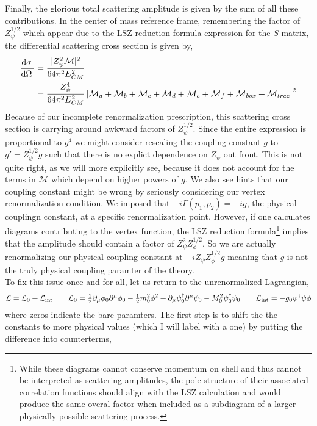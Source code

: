 \documentclass{article}
\begin{document}
Finally, the glorious total scattering amplitude is given by the sum of all these contributions. In the center of mass reference frame, remembering the factor of $Z_\psi^{1/2}$ which appear due to the LSZ reduction formula expression for the $S$ matrix, the differential scattering cross section is given by,
\begin{align*}
\frac{\mathrm{d}\sigma \:}{\mathrm{d}\Omega \:} & = \frac{|Z^2_{\psi} \mathcal{M}|^2}{64 \pi^2 E_{CM}^2}
\\
& = \frac{Z^4_{\psi}}{64 \pi^2 E_{CM}^2} \left| \mathcal{M}_a + \mathcal{M}_b + \mathcal{M}_c + \mathcal{M}_d + \mathcal{M}_e + \mathcal{M}_f + \mathcal{M}_{box} + \mathcal{M}_{tree} \right|^2 
\end{align*}
Because of our incomplete renormalization prescription, this scattering cross section is carrying around awkward factors of $Z_\psi^{1/2}$. Since the entire expression is proportional to $g^4$ we might consider rescaling the coupling constant $g$ to $g' = Z_\psi^{1/2} g$ such that there is no explict dependence on $Z_\psi$ out front. This is not quite right, as we will more explicitly see, because it does not account for the terms in $\mathcal{M}$ which depend on higher powers of $g$. We also see hints that our coupling constant might be wrong by seriously considering our vertex renormalization condition. We imposed that $-i \Gamma(p_1, p_2) = -ig$, the physical couplingn constant, at a specific renormalization point. However, if one calculates diagrams contributing to the vertex function, the LSZ reduction formula\footnote{While these diagrams cannot conserve momentum on shell and thus cannot be interpreted as scattering amplitudes, the pole structure of their associated correlation functions should align with the LSZ calculation and would produce the same overal factor when included as a subdiagram of a larger physically possible scattering process.} implies that the amplitude should contain a factor of $Z_\psi^2 Z_\phi^{1/2}$. So we are actually renormalizing our physical coupling constant at $- i Z_\psi Z_\phi^{1/2} g$ meaning that $g$ is not the truly physical coupling paramter of the theory. \bigskip\\
To fix this issue once and for all, let us return to the unrenormalized Lagrangian,
\[ \mathcal{L} = \mathcal{L}_0 + \mathcal{L}_{\mathrm{int}} \quad \quad \mathcal{L}_0 = \tfrac{1}{2} \partial_\mu \phi_0 \partial^\mu \phi_0 - \tfrac{1}{2} m_0^2 \phi^2 + \partial_\mu \psi^\dagger_0 \partial^\mu \psi_0 - M_0^2 \psi^\dagger_0 \psi_0 \quad \quad \mathcal{L}_{\mathrm{int}} = -g_0 \psi^\dagger \psi \phi \]  
where zeros indicate the bare paramters. The first step is to shift the the constants to more physical values (which I will label with a one) by putting the difference into counterterms,
\end{document}
